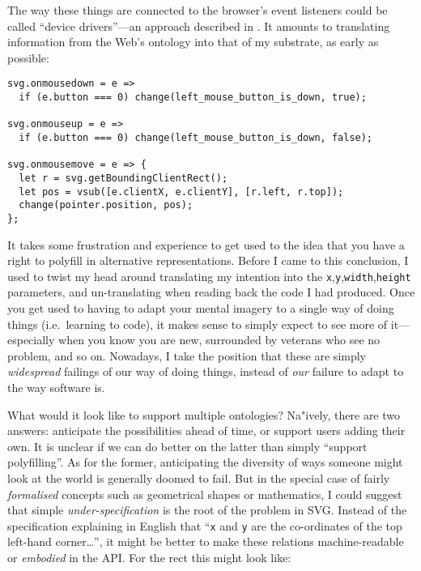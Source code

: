 The way these things are connected to the browser's event listeners
could be called ``device drivers''---an approach described in
\cite{prog21-bbox}. It amounts to translating information from the Web's
ontology into that of my substrate, as early as possible:

\begin{lstlisting}
svg.onmousedown = e =>
  if (e.button === 0) change(left_mouse_button_is_down, true);

svg.onmouseup = e =>
  if (e.button === 0) change(left_mouse_button_is_down, false);

svg.onmousemove = e => {
  let r = svg.getBoundingClientRect();
  let pos = vsub([e.clientX, e.clientY], [r.left, r.top]);
  change(pointer.position, pos);
};
\end{lstlisting}

It takes some frustration and experience to get used to the idea that
you have a right to polyfill in alternative representations. Before I
came to this conclusion, I used to twist my head around translating my
intention into the
\texttt{x},\texttt{y},\texttt{width},\texttt{height}{} parameters, and
un-translating when reading back the code I had produced. Once you get
used to having to adapt your mental imagery to a single way of doing
things (i.e.~learning to code), it makes sense to simply expect to see
more of it---especially when you know you are new, surrounded by
veterans who see no problem, and so on. Nowadays, I take the position
that these are simply \emph{widespread} failings of our way of doing
things, instead of \emph{our} failure to adapt to the way software is.

What would it look like to support multiple ontologies? Na"ively, there
are two answers: anticipate the possibilities ahead of time, or support
users adding their own. It is unclear if we can do better on the latter
than simply ``support polyfilling''. As for the former, anticipating the
diversity of ways someone might look at the world is generally doomed to
fail. But in the special case of fairly \emph{formalised} concepts such
as geometrical shapes or mathematics, I could suggest that simple
\emph{under-specification} is the root of the problem in SVG. Instead of
the specification explaining in English that ``\texttt{x} and \texttt{y}
are the co-ordinates of the top left-hand corner\ldots{}'', it might be
better to make these relations machine-readable or \emph{embodied} in
the API. For the rect this might look like:

